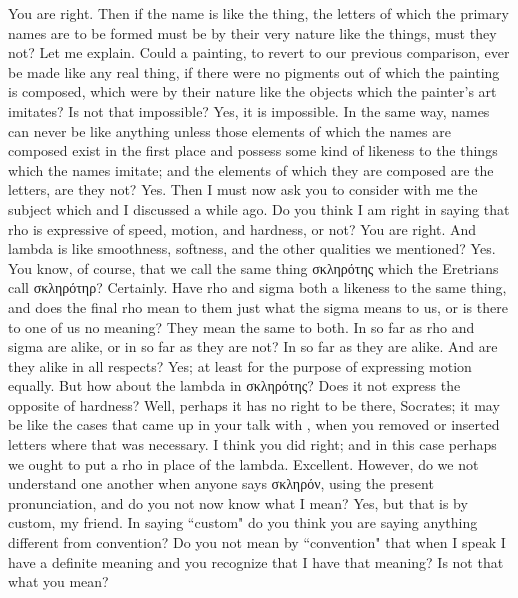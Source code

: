 {{{{{\socratesspeaks
You are right. Then if the name is like the thing, the letters of which the primary names are to be formed must be by their very nature like the things, must they not? Let me explain. Could a painting, to revert to our previous comparison, ever be made like any real thing, if there were no pigments out of which the painting is composed,  which were by their nature like the objects which the painter's art imitates? Is not that impossible?
\cratylusspeaks
Yes, it is impossible.
\socratesspeaks
In the same way, names can never be like anything unless those elements of which the names are composed exist in the first place and possess some kind of likeness to the things which the names imitate; and the elements of which they are composed are the letters, are they not?
\cratylusspeaks
Yes.
\socratesspeaks
Then I must now ask you to consider with me the subject which \hermogenesspeaks and I discussed a while ago.  Do you think I am right in saying that rho is expressive of speed, motion, and hardness, or not?
\cratylusspeaks
You are right.
\socratesspeaks
And lambda is like smoothness, softness, and the other qualities we mentioned?
\cratylusspeaks
Yes.
\socratesspeaks
You know, of course, that we call the same thing σκληρότης  which the Eretrians call σκληρότηρ?
\cratylusspeaks
Certainly.
\socratesspeaks
Have rho and sigma both a likeness to the same thing, and does the final rho mean to them just what the sigma means to us, or is there to one of us no meaning? 
\cratylusspeaks
They mean the same to both.
\socratesspeaks
In so far as rho and sigma are alike, or in so far as they are not?
\cratylusspeaks
In so far as they are alike.
\socratesspeaks
And are they alike in all respects?
\cratylusspeaks
Yes; at least for the purpose of expressing motion equally.
\socratesspeaks
But how about the lambda in σκληρότης? Does it not express the opposite of hardness?
\cratylusspeaks
Well, perhaps it has no right to be there, Socrates; it may be like the cases that came up in your talk with \hermogenesspeaks, when you removed or inserted letters where that was necessary. I think you did right; and in this case perhaps we ought to put a rho in place of the lambda. 
\socratesspeaks
Excellent. However, do we not understand one another when anyone says σκληρόν, using the present pronunciation, and do you not now know what I mean?
\cratylusspeaks
Yes, but that is by custom, my friend.
\socratesspeaks
In saying ``custom" do you think you are saying anything different from convention? Do you not mean by ``convention" that when I speak I have a definite meaning and you recognize that I have that meaning? Is not that what you mean? 
}}}}}

